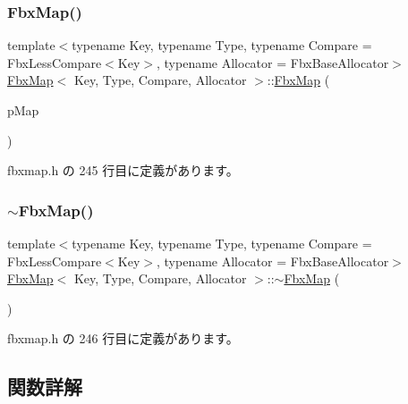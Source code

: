\mbox{\label{class_fbx_map_a3b0b46c7a7698ab185aea731bfe52b69}} 
\subsubsection{\texorpdfstring{Fbx\+Map()}{FbxMap()}\hspace{0.1cm}{\footnotesize\ttfamily [2/2]}}
{\footnotesize\ttfamily template$<$typename Key, typename Type, typename Compare = Fbx\+Less\+Compare$<$\+Key$>$, typename Allocator = Fbx\+Base\+Allocator$>$ \\
\hyperlink{class_fbx_map}{Fbx\+Map}$<$ Key, Type, Compare, Allocator $>$\+::\hyperlink{class_fbx_map}{Fbx\+Map} (\begin{DoxyParamCaption}\item[{const \hyperlink{class_fbx_map}{Fbx\+Map}$<$ Key, Type, Compare, Allocator $>$ \&}]{p\+Map }\end{DoxyParamCaption})\hspace{0.3cm}{\ttfamily [inline]}}



 fbxmap.\+h の 245 行目に定義があります。

\mbox{\label{class_fbx_map_ac0883128b3b0a4c25e55d153841d2a01}} 
\subsubsection{\texorpdfstring{$\sim$\+Fbx\+Map()}{~FbxMap()}}
{\footnotesize\ttfamily template$<$typename Key, typename Type, typename Compare = Fbx\+Less\+Compare$<$\+Key$>$, typename Allocator = Fbx\+Base\+Allocator$>$ \\
\hyperlink{class_fbx_map}{Fbx\+Map}$<$ Key, Type, Compare, Allocator $>$\+::$\sim$\hyperlink{class_fbx_map}{Fbx\+Map} (\begin{DoxyParamCaption}{ }\end{DoxyParamCaption})\hspace{0.3cm}{\ttfamily [inline]}}



 fbxmap.\+h の 246 行目に定義があります。



\subsection{関数詳解}
\mbox{\label{class_fbx_map_ae4c5e09fb73bde49ef7f53ab0ad11fbd}} 
